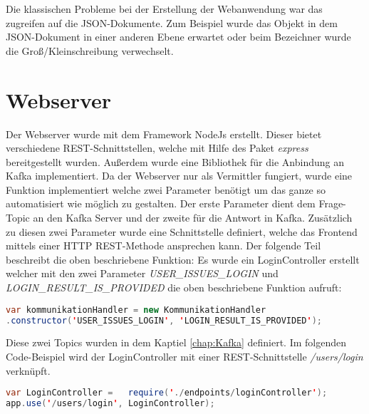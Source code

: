 
Die klassischen Probleme bei der Erstellung der Webanwendung war das zugreifen auf die JSON-Dokumente. Zum Beispiel wurde das Objekt in dem JSON-Dokument in einer anderen Ebene erwartet oder beim Bezeichner wurde die Groß/Kleinschreibung verwechselt.


\section{Webserver}
Der Webserver wurde mit dem Framework NodeJs erstellt. Dieser bietet verschiedene REST-Schnittstellen, welche mit Hilfe des Paket \textit{express} bereitgestellt wurden. Außerdem wurde eine Bibliothek für die Anbindung an Kafka implementiert. Da der Webserver nur als Vermittler fungiert, wurde eine Funktion implementiert welche zwei Parameter benötigt um das ganze so automatisiert wie möglich zu gestalten. Der erste Parameter dient dem Frage-Topic an den Kafka Server und der zweite für die Antwort in Kafka. Zusätzlich zu diesen zwei Parameter wurde eine Schnittstelle definiert, welche das Frontend mittels einer  HTTP REST-Methode ansprechen kann. Der folgende Teil beschreibt die oben beschriebene Funktion: 
Es wurde ein LoginController erstellt welcher mit den zwei Parameter \textit{USER\_ISSUES\_LOGIN} und \textit{LOGIN\_RESULT\_IS\_PROVIDED} die oben beschriebene Funktion aufruft: \\
\begin{lstlisting}[language=Java, basicstyle=\small, firstnumber=1] 
var kommunikationHandler = new KommunikationHandler
.constructor('USER_ISSUES_LOGIN', 'LOGIN_RESULT_IS_PROVIDED');
\end{lstlisting} 
Diese zwei Topics wurden in dem Kaptiel \ref{chap:Kafka} definiert. Im folgenden Code-Beispiel wird der LoginController mit einer REST-Schnittstelle \textit{/users/login} verknüpft. \\
\begin{lstlisting}[language=Java, basicstyle=\small] 
var LoginController = 	require('./endpoints/loginController');
app.use('/users/login', LoginController);
\end{lstlisting}

